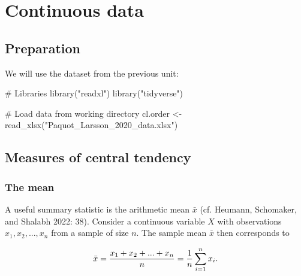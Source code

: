\documentclass[
  11pt,
  letterpaper,
  DIV=11,
  numbers=noendperiod]{scrreprt}
\newenvironment{Shaded}{\begin{snugshade}}{\end{snugshade}}
\newcommand{\CommentTok}[1]{\textcolor[rgb]{0.37,0.37,0.37}{#1}}
\newcommand{\FunctionTok}[1]{\textcolor[rgb]{0.28,0.35,0.67}{#1}}
\newcommand{\NormalTok}[1]{\textcolor[rgb]{0.00,0.23,0.31}{#1}}
\newcommand{\OtherTok}[1]{\textcolor[rgb]{0.00,0.23,0.31}{#1}}
\newcommand{\StringTok}[1]{\textcolor[rgb]{0.13,0.47,0.30}{#1}}
\begin{document}
\chapter{Continuous data}\label{continuous-data}

\section{Preparation}\label{preparation-4}

We will use the dataset from the previous unit:

\begin{Shaded}
\begin{Highlighting}[]
\CommentTok{\# Libraries}
\FunctionTok{library}\NormalTok{(}\StringTok{"readxl"}\NormalTok{)}
\FunctionTok{library}\NormalTok{(}\StringTok{"tidyverse"}\NormalTok{)}

\CommentTok{\# Load data from working directory}
\NormalTok{cl.order }\OtherTok{\textless{}{-}} \FunctionTok{read\_xlsx}\NormalTok{(}\StringTok{"Paquot\_Larsson\_2020\_data.xlsx"}\NormalTok{)}
\end{Highlighting}
\end{Shaded}

\section{Measures of central
tendency}\label{measures-of-central-tendency}

\subsection{The mean}\label{the-mean}

A useful summary statistic is the arithmetic mean \(\bar{x}\) (cf.
Heumann, Schomaker, and Shalabh 2022: 38). Consider a continuous
variable \(X\) with observations \(x_1, x_2, ..., x_n\) from a sample of
size \(n\). The sample mean \(\bar{x}\) then corresponds to

\[
\bar{x} = \frac{x_1 + x_2 + ... + x_n}{n} \\ = \frac{1}{n}\sum_{i=1}^n{x_i}.
\]
\end{document}
